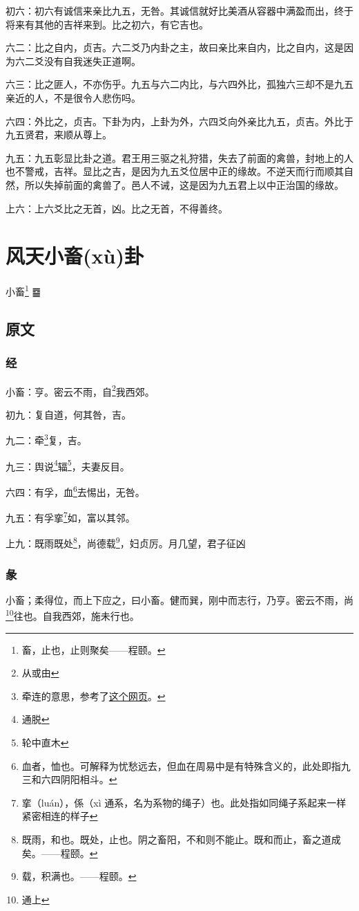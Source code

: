 \documentclass[12pt,oneside]{book}
\begin{document}
初六：初六有诚信来亲比九五，无咎。其诚信就好比美酒从容器中满盈而出，终于将来有其他的吉祥来到。比之初六，有它吉也。

六二：比之自内，贞吉。六二爻乃内卦之主，故曰亲比来自内，比之自内，这是因为六二爻没有自我迷失正道啊。

六三：比之匪人，不亦伤乎。九五与六二内比，与六四外比，孤独六三却不是九五亲近的人，不是很令人悲伤吗。

六四：外比之，贞吉。下卦为内，上卦为外，六四爻向外亲比九五，贞吉。外比于九五贤君，来顺从尊上。

九五：九五彰显比卦之道。君王用三驱之礼狩猎，失去了前面的禽兽，封地上的人也不警戒，吉祥。显比之吉，是因为九五爻位居中正的缘故。不逆天而行而顺其自然，所以失掉前面的禽兽了。邑人不诫，这是因为九五君上以中正治国的缘故。

上六：上六爻比之无首，凶。比之无首，不得善终。



\chapter{风天小畜(xù)卦}
小畜\footnote{畜，止也，止则聚矣——程颐。} {\Large ䷈}

\section{原文}

\subsection{经}
小畜：亨。密云不雨，自\footnote{从或由}我西郊。

初九：复自道，何其咎，吉。

九二：牵\footnote{牵连的意思，参考了\href{http://baike.yidao5.com/jingzhuan/xiaoxugua/6428.shtml}{这个网页}。}复，吉。

九三：舆说\footnote{通脱}辐\footnote{轮中直木}，夫妻反目。

六四：有孚，血\footnote{血者，恤也。可解释为忧愁远去，但血在周易中是有特殊含义的，此处即指九三和六四阴阳相斗。}去惕出，无咎。

九五：有孚挛\footnote{挛（luán），係（xì 通系，名为系物的绳子）也。此处指如同绳子系起来一样紧密相连的样子}如，富以其邻。

上九：既雨既处\footnote{既雨，和也。既处，止也。阴之畜阳，不和则不能止。既和而止，畜之道成矣。——程颐。}，尚德载\footnote{载，积满也。——程颐。}，妇贞厉。月几望，君子征凶

\subsection{彖}
小畜；柔得位，而上下应之，曰小畜。健而巽，刚中而志行，乃亨。密云不雨，尚\footnote{通上}往也。自我西郊，施未行也。
\end{document}
